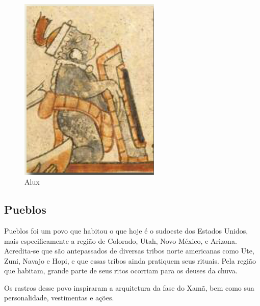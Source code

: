 \begin{figure}[!htb] \caption{\label{fig_alux}Alux} \begin{center}
\includegraphics[width=0.6\textwidth]{imagens/alux.jpg} \end{center}
 \end{figure}

\clearpage

\subsection{Pueblos}

Pueblos foi  um povo que habitou o que hoje é o sudoeste dos Estados Unidos, mais especificamente a região de Colorado, Utah, Novo México, e Arizona.\cite{civPerdidas2017,lyneis1995virgin} Acredita-se que são antepassados de diversas tribos norte americanas como Ute, Zuni, Navajo e Hopi, e que essas tribos ainda pratiquem seus rituais. Pela região que habitam, grande parte de seus ritos ocorriam para os deuses da chuva\cite{abreu94}.

Os rastros desse povo inspiraram a arquitetura da fase do Xamã, bem como sua personalidade, vestimentas e ações.

